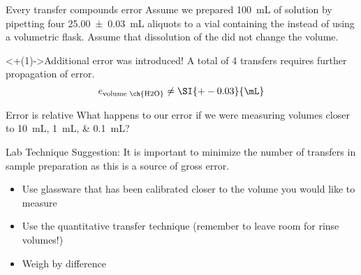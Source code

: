 \documentclass[notes=hide]{beamer}
\begin{document}
\begin{frame}[t]{Every transfer compounds error}
	Assume we prepared \SI{100}{\milli\liter} of solution by pipetting four
	\SI{25.00 +- 0.03}{\milli\liter} aliquots to a vial containing the
	 instead of using a volumetric flask.
	Assume that dissolution of the  did not
	change the volume.

	\begin{alertblock}<+(1)->{Additional error was introduced!}
		A total of 4 transfers requires further propagation of error.
		\begin{equation*}
			e_\text{volume~\ch{H2O}} \neq \SI{+-0.03}{\mL}
		\end{equation*}
	\end{alertblock}

\end{frame}

\clearpage

\begin{frame}{Error is relative}
	What happens to our error if we were measuring volumes closer to
	\SIlist[list-final-separator={, or }]{10;1;0.1}{\mL}?

	\bigskip

	\pause

	\begin{block}{Lab Technique Suggestion:}
		It is important to minimize the number of transfers in sample
		preparation as this is a source of \alert{gross error}.
		\begin{itemize}
			\item Use glassware that has been calibrated closer to
				the volume you would like to measure
			\item Use the quantitative transfer technique (remember
				to leave room for rinse volumes!)
			\item Weigh by difference
		\end{itemize}
	\end{block}
\end{frame}
\end{document}

